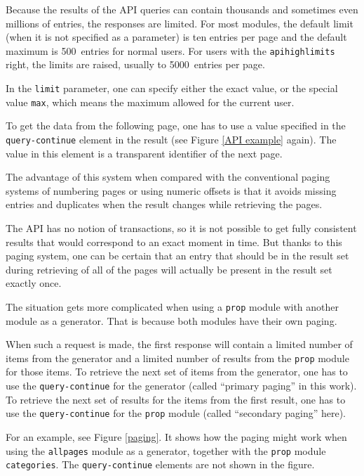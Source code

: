 Because the results of the API queries can contain thousands and sometimes even millions of entries,
the responses are limited.
For most modules, the default limit (when it is not specified as a parameter) is ten entries per page
and the default maximum is 500~entries for normal users.
For users with the \texttt{apihighlimits} right, the limits are raised, usually to 5000~entries per page.

In the \texttt{limit} parameter, one can specify either the exact value,
or the special value \texttt{max}, which means the maximum allowed for the current user.

To get the data from the following page, one has to use a value specified in the \texttt{query-continue}
element in the result (see Figure \ref{API example} again).
The value in this element is a transparent identifier of the next page.

The advantage of this system when compared with the conventional paging systems of numbering pages
or using numeric offsets is that it avoids missing entries and duplicates when the result
changes while retrieving the pages.

The API has no notion of transactions, so it is not possible to get fully consistent results
that would correspond to an exact moment in time.
But thanks to this paging system, one can be certain that an entry that should be in the result set
during retrieving of all of the pages will actually be present in the result set exactly once.

\medskip

The situation gets more complicated when using a \texttt{prop} module with another module as a generator.
That is because both modules have their own paging.

When such a request is made, the first response will contain a limited number of items from the generator
and a limited number of results from the \texttt{prop} module for those items.
To retrieve the next set of items from the generator, one has to use the \texttt{query-continue} for the generator
(called “primary paging” in this work).
To retrieve the next set of results for the items from the first result,
one has to use the \texttt{query-continue} for the \texttt{prop} module (called “secondary paging” here).

For an example, see Figure \ref{paging}.
It shows how the paging might work when using the \texttt{allpages} module as a generator,
together with the \texttt{prop} module \texttt{categories}.
The \texttt{query-continue} elements are not shown in the figure.

